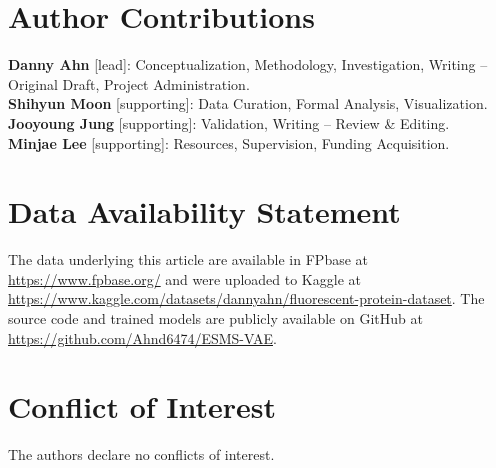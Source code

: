 \documentclass[unnumsec,webpdf,contemporary,medium]{oup-authoring-template}
\begin{document}
\section*{Author Contributions}

\textbf{Danny Ahn} [lead]: Conceptualization, Methodology, Investigation, Writing – Original Draft, Project Administration.\\
\textbf{Shihyun Moon} [supporting]: Data Curation, Formal Analysis, Visualization.\\
\textbf{Jooyoung Jung} [supporting]: Validation, Writing – Review \& Editing.\\
\textbf{Minjae Lee} [supporting]: Resources, Supervision, Funding Acquisition.


\section*{Data Availability Statement}
The data underlying this article are available in FPbase at \href{https://www.fpbase.org/}{https://www.fpbase.org/} and were uploaded to Kaggle at \href{https://www.kaggle.com/datasets/dannyahn/fluorescent-protein-dataset}{https://www.kaggle.com/datasets/dannyahn/fluorescent-protein-dataset}. The source code and trained models are publicly available on GitHub at \href{https://github.com/Ahnd6474/ESMS-VAE}{https://github.com/Ahnd6474/ESMS-VAE}.

\section*{Conflict of Interest}
The authors declare no conflicts of interest.


\end{document}
